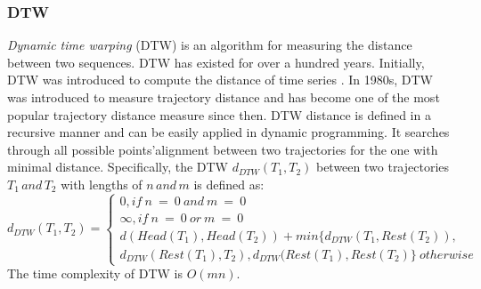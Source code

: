 \documentclass[a4paper, 12pt]{article}
\begin{document}
\subsubsection{DTW}
\textit{Dynamic time warping} (DTW) is an algorithm for measuring the distance between two sequences. DTW has existed for over a hundred years. Initially, DTW was introduced to compute the distance of time series \citep{myers1980performance}. In 1980s, DTW was introduced to measure trajectory distance \citep{kruskal1983overview} and has become one of the most popular trajectory distance measure since then. DTW distance is defined in a recursive manner and can be easily applied in dynamic programming. It searches through all possible points’alignment between two trajectories for the one with minimal distance. Specifically, the DTW $d_{DTW} (T_{1},T_{2})$ between two trajectories $T_{1}\,and\,T_{2}$ with lengths of $n\,and\,m$ is defined as:
\begin{equation} \label{eq2}
    d_{DTW} (T_{1},T_{2}) = \begin{cases}
                                0, if\:n\:=\:0\:and\:m\:=\:0 \\
                                \infty, if\:n\:=\:0\:or\:m\:=\:0 \\
                                d(Head(T_{1}), Head(T_{2})) + min\{d_{DTW}(T_{1}, Rest(T_{2})), \\ d_{DTW}(Rest(T_{1}), T_{2}), d_{DTW}(Rest(T_{1}), Rest(T_{2}) \} \: otherwise
                            \end{cases}
\end{equation}
The time complexity of DTW is $O(mn)$.
\end{document}
